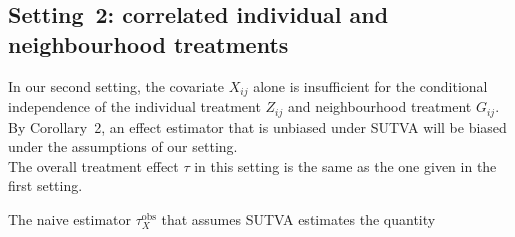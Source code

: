 \documentclass[10pt]{article}
\begin{document}
\subsection{Setting~2: correlated individual and neighbourhood treatments}

In our second setting, the covariate $X_{ij}$ alone is insufficient for the conditional independence of the individual treatment $Z_{ij}$ and neighbourhood treatment $G_{ij}$. By Corollary~2, an effect estimator that is unbiased under SUTVA will be biased under the assumptions of our setting.
\\

The overall treatment effect $\tau$ in this setting is the same as the one given in the first setting.
\iffalse
\begin{align*}
\tau &= \tau(0)\P(G_{ij}=0) + \tau(1)\P(G_{ij}=1) \\
&= \sum_{x_1,x_2\in\{0,1\}}\left(\tau(0)\P(G_{ij}=0|X_{i1}=x_1,X_{i2}=x_2) + \tau(1)\P(G_{ij}=1|X_{i1}=x_1,X_{i2}=x_2)\right)\P(X_{i1}=x_1,X_{i2}=x_2) \\
&= \frac{1}{4}\left(\tau(0)\left(\frac{1}{2}+\frac{3}{2}\right) + \tau(1)\left(\frac{3}{2}+\frac{1}{2}\right)\right) \\
&= \frac{1}{2}\left(\mu(1,0) + \mu(1,1) - \mu(0,0) - \mu(0,1)\right) \;.
\end{align*}
\fi
The naive estimator $\tau_{X}^\text{obs}$ that assumes SUTVA estimates the quantity
\end{document}
